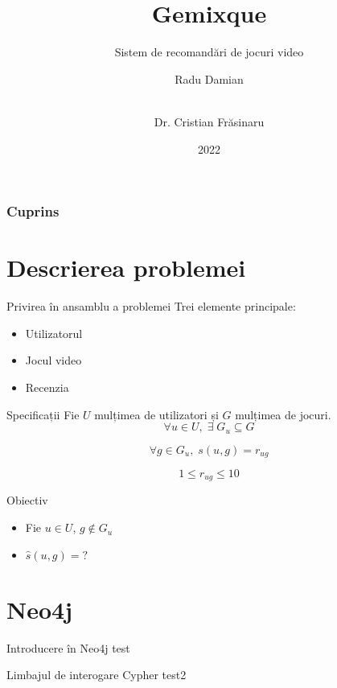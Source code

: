 \documentclass{beamer}
\title[Gemixque - sistem de recomandări de jocuri video]{Gemixque}
\subtitle{Sistem de recomandări de jocuri video}
\author[Radu Damian]{Radu Damian \and \\[9mm] Dr. Cristian Frăsinaru}
\institute{Facultatea de Informatică}
\date{2022}
\begin{document}
\frame{\titlepage}


\begin{frame}
  \frametitle{Cuprins}
  \tableofcontents
\end{frame}

\section{Descrierea problemei}
\frame{\tableofcontents[currentsection]}

\begin{frame}{Privirea în ansamblu a problemei}
   Trei elemente principale:
   \begin{itemize}
  \item Utilizatorul
  \item Jocul video
  \item Recenzia
  \end{itemize}
\end{frame}

\begin{frame}{Specificații}
    Fie  \(U \)  mulțimea de utilizatori și \( G \) mulțimea de  jocuri. 
     \[ \forall  u  \in  U,  \;  \exists \; G_u \subseteq  G  \] 
     
     \[ \forall g \in G_u, \; s(u, g) = r_{ug}\]
     
     \[ 1 \leq r_{ug} \leq 10\]
     
    
    
\end{frame}

\begin{frame}{Obiectiv}
\begin{itemize}
  \item Fie \( u \in U \), \(g \notin G_u \) 
  \item \( \hat{s}(u, g) = ?\)
  \end{itemize}
\end{frame}

\section{Neo4j}
\frame{\tableofcontents[currentsection]}
\begin{frame}{Introducere în Neo4j}
    test
\end{frame}

\begin{frame}{Limbajul de interogare Cypher}
    test2
\end{frame}
\end{document}
